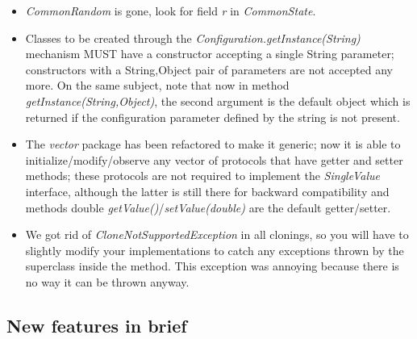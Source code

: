 \documentclass[a4paper,11pt]{article}
\begin{document}
\begin{itemize}
\item \emph{CommonRandom} is gone, look for field \emph{r} in
  \emph{CommonState}.

\item Classes to be created through the
  \emph{Configuration.getInstance(String)}  
  mechanism MUST have a constructor accepting a single String
  parameter; constructors 
  with a String,Object pair of parameters are not accepted any more.
  On the same subject, note that now in method
  \emph{getInstance(String,Object)}, 
  the second argument is the default object which is returned if the
  configuration parameter defined by the string is not present.

\item The \emph{vector} package has been refactored to make it
  generic; now it is able 
  to initialize/modify/observe any vector of protocols that have getter and
  setter methods; these protocols are not required to implement the 
  \emph{SingleValue} interface, although the latter is still there for
  backward  
  compatibility and methods double
  \emph{getValue()}/\emph{setValue(double)} are the  
  default getter/setter.

\item We got rid of \emph{CloneNotSupportedException} in all clonings,
  so you will have 
  to slightly modify your implementations to catch any exceptions thrown by 
  the superclass inside the method. This exception was annoying because 
  there is no way it can be thrown anyway.
\end{itemize} 


\subsection{New features in brief}
\label{s:new_features}
\end{document}
